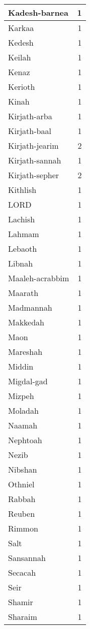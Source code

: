 \begin{center}
\begin{longtable}{l|r}
Kadesh-barnea & 1\\ \hline 
Karkaa & 1\\ \hline 
Kedesh & 1\\ \hline 
Keilah & 1\\ \hline 
Kenaz & 1\\ \hline 
Kerioth & 1\\ \hline 
Kinah & 1\\ \hline 
Kirjath-arba & 1\\ \hline 
Kirjath-baal & 1\\ \hline 
Kirjath-jearim & 2\\ \hline 
Kirjath-sannah & 1\\ \hline 
Kirjath-sepher & 2\\ \hline 
Kithlish & 1\\ \hline 
LORD & 1\\ \hline 
Lachish & 1\\ \hline 
Lahmam & 1\\ \hline 
Lebaoth & 1\\ \hline 
Libnah & 1\\ \hline 
Maaleh-acrabbim & 1\\ \hline 
Maarath & 1\\ \hline 
Madmannah & 1\\ \hline 
Makkedah & 1\\ \hline 
Maon & 1\\ \hline 
Mareshah & 1\\ \hline 
Middin & 1\\ \hline 
Migdal-gad & 1\\ \hline 
Mizpeh & 1\\ \hline 
Moladah & 1\\ \hline 
Naamah & 1\\ \hline 
Nephtoah & 1\\ \hline 
Nezib & 1\\ \hline 
Nibshan & 1\\ \hline 
Othniel & 1\\ \hline 
Rabbah & 1\\ \hline 
Reuben & 1\\ \hline 
Rimmon & 1\\ \hline 
Salt & 1\\ \hline 
Sansannah & 1\\ \hline 
Secacah & 1\\ \hline 
Seir & 1\\ \hline 
Shamir & 1\\ \hline 
Sharaim & 1\\ \hline 

\end{longtable}
\end{center}

